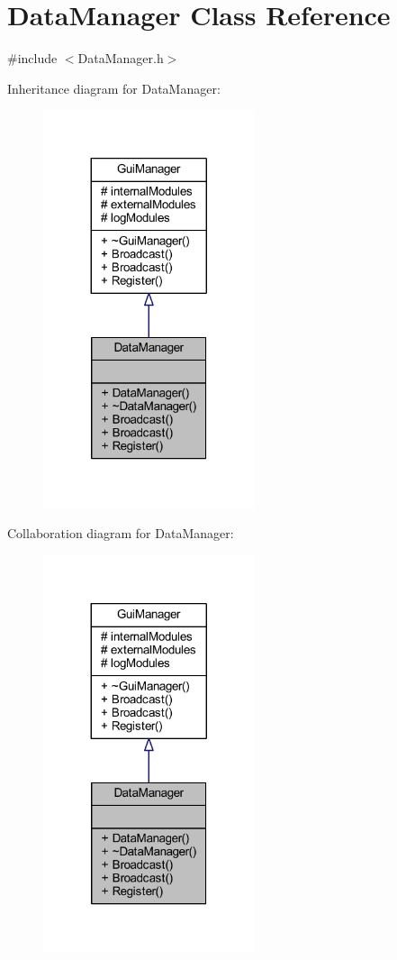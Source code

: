 \hypertarget{class_data_manager}{}\section{Data\+Manager Class Reference}
\label{class_data_manager}


{\ttfamily \#include $<$Data\+Manager.\+h$>$}



Inheritance diagram for Data\+Manager\+:
\nopagebreak
\begin{figure}[H]
\begin{center}
\leavevmode
\includegraphics[width=176pt]{class_data_manager__inherit__graph}
\end{center}
\end{figure}


Collaboration diagram for Data\+Manager\+:
\nopagebreak
\begin{figure}[H]
\begin{center}
\leavevmode
\includegraphics[width=176pt]{class_data_manager__coll__graph}
\end{center}
\end{figure}
